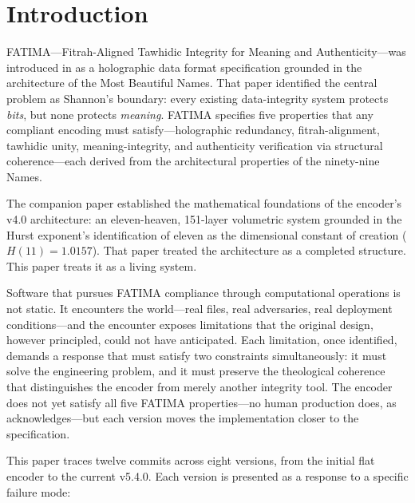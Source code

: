 \documentclass[11pt,a4paper]{article}
\begin{document}
\vspace{1em}

\section{Introduction}

FATIMA---Fitrah-Aligned Tawhidic Integrity for Meaning and Authenticity---was introduced in \cite{arfeen2026fatima} as a holographic data format specification grounded in the architecture of the Most Beautiful Names. That paper identified the central problem as Shannon's boundary: every existing data-integrity system protects \textit{bits}, but none protects \textit{meaning}. FATIMA specifies five properties that any compliant encoding must satisfy---holographic redundancy, fitrah-alignment, tawhidic unity, meaning-integrity, and authenticity verification via structural coherence---each derived from the architectural properties of the ninety-nine Names.

The companion paper \cite{arfeen2026heavens} established the mathematical foundations of the encoder's v4.0 architecture: an eleven-heaven, 151-layer volumetric system grounded in the Hurst exponent's identification of eleven as the dimensional constant of creation ($H(11) = 1.0157$). That paper treated the architecture as a completed structure. This paper treats it as a living system.

Software that pursues FATIMA compliance through computational operations is not static. It encounters the world---real files, real adversaries, real deployment conditions---and the encounter exposes limitations that the original design, however principled, could not have anticipated. Each limitation, once identified, demands a response that must satisfy two constraints simultaneously: it must solve the engineering problem, and it must preserve the theological coherence that distinguishes the encoder from merely another integrity tool. The encoder does not yet satisfy all five FATIMA properties---no human production does, as \cite{arfeen2026fatima} acknowledges---but each version moves the implementation closer to the specification.

This paper traces twelve commits across eight versions, from the initial flat encoder to the current v5.4.0. Each version is presented as a response to a specific failure mode:
\end{document}
